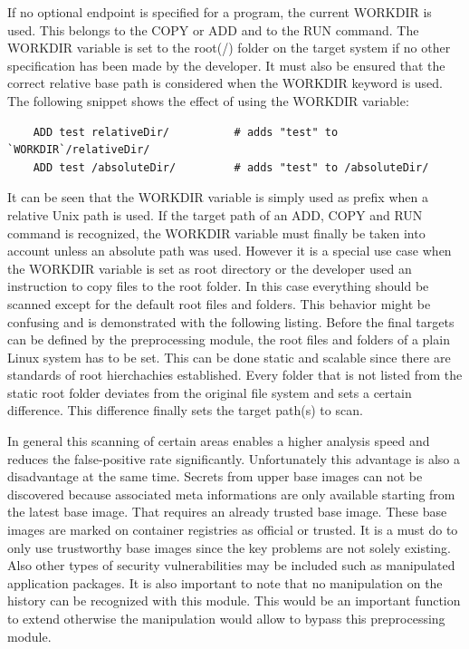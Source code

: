 If no optional endpoint is specified for a program, the current WORKDIR is used. This belongs to the COPY or ADD and to the RUN command.
The WORKDIR variable is set to the root(/) folder on the target system if no other specification has been made by the developer. 
It must also be ensured that the correct relative base path is considered when the WORKDIR keyword is used. 
The following snippet shows the effect of using the WORKDIR variable:
\begin{lstlisting}
	ADD test relativeDir/          # adds "test" to `WORKDIR`/relativeDir/
	ADD test /absoluteDir/         # adds "test" to /absoluteDir/
\end{lstlisting}
It can be seen that the WORKDIR variable is simply used as prefix when a relative Unix path is used.
If the target path of an ADD, COPY and RUN command is recognized, the WORKDIR variable must finally be taken into account unless an absolute path was used.
However it is a special use case when the WORKDIR variable is set as root directory or the developer used an instruction to copy files to the root folder. 
In this case everything should be scanned except for the default root files and folders.
This behavior might be confusing and is demonstrated with the following listing.
Before the final targets can be defined by the preprocessing module, the root files and folders of a plain Linux system has to be set. 
This can be done static and scalable since there are standards of root hierchachies established.
Every folder that is not listed from the static root folder deviates from the original file system and sets a certain difference. 
This difference finally sets the target path(s) to scan. 

In general this scanning of certain areas enables a higher analysis speed and reduces the false-positive rate significantly.
Unfortunately this advantage is also a disadvantage at the same time. 
Secrets from upper base images can not be discovered because associated meta informations are only available starting from the latest base image.
That requires an already trusted base image.
These base images are marked on container registries as official or trusted. 
It is a must do to only use trustworthy base images since the key problems are not solely existing. 
Also other types of security vulnerabilities may be included such as manipulated application packages. 
It is also important to note that no manipulation on the history can be recognized with this module. 
This would be an important function to extend otherwise the manipulation would allow to bypass this preprocessing module. 

